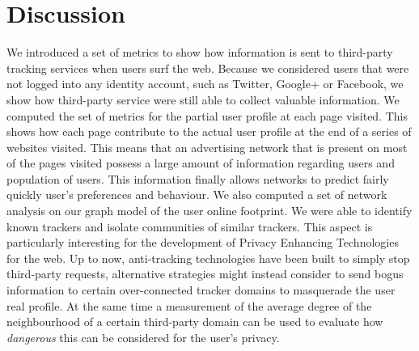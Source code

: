 \section{Discussion}

We introduced a set of metrics to show how information is sent to third-party tracking services when users surf the web. Because we considered users that were not logged into any identity account, such as Twitter, Google+ or Facebook, we show how third-party service were still able to collect valuable information. 
We computed the set of metrics for the partial user profile at each page visited. This shows how each page contribute to the actual user profile at the end of a series of websites visited. This means that an advertising network that is present on most of the pages visited possess a large amount of information regarding users and population of users. This information finally allows networks to predict fairly quickly user's preferences and behaviour. 
We also computed a set of network analysis on our graph model of the user online footprint. We were able to identify known trackers and isolate communities of similar trackers. This aspect is particularly interesting for the development of Privacy Enhancing Technologies for the web. Up to now, anti-tracking technologies have been built to simply stop third-party requests, alternative strategies might instead consider to send bogus information to certain over-connected tracker domains to masquerade the user real profile. At the same time a measurement of the average degree of the neighbourhood of a certain third-party domain can be used to evaluate how \emph{dangerous} this can be considered for the user's privacy.